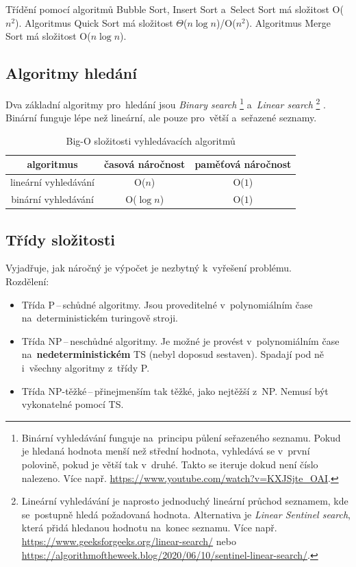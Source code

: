 Třídění pomocí algoritmů Bubble Sort, Insert Sort a~Select Sort má složitost O(\( n^2 \)). Algoritmus Quick Sort má složitost \( \Theta \)(\( n\log{n} \))/O(\( n^2 \)). Algoritmus Merge Sort má složitost O(\( n\log{n} \)).

\subsection{Algoritmy hledání}

Dva základní algoritmy pro~hledání jsou \textit{Binary search}%
\footnote{Binární vyhledávání funguje na~principu půlení seřazeného seznamu. Pokud je hledaná hodnota menší než střední hodnota, vyhledává se v~první polovině, pokud je větší tak v~druhé. Takto se iteruje dokud není číslo nalezeno. Více např. \url{https://www.youtube.com/watch?v=KXJSjte_OAI}.} %
a~\textit{Linear search}%
\footnote{Lineární vyhledávání je naprosto jednoduchý lineární průchod seznamem, kde se~postupně hledá požadovaná hodnota. Alternativa je \emph{Linear Sentinel search}, která přidá hledanou hodnotu na~konec seznamu. Více např. \url{https://www.geeksforgeeks.org/linear-search/} nebo \url{https://algorithmoftheweek.blog/2020/06/10/sentinel-linear-search/}.}%
. Binární funguje lépe než lineární, ale pouze pro~větší a~seřazené seznamy.

\begin{table}[h]
	\centering
	\caption{Big-O složitosti vyhledávacích algoritmů}
	\begin{tabular}{|c||c|c|}\hline
		algoritmus           & časová náročnost & paměťová náročnost \\\hline\hline
		lineární vyhledávání & O(\( n \))       & O(\( 1 \))         \\\hline
		binární vyhledávání  & O(\( \log n \))  & O(\( 1 \))         \\\hline
	\end{tabular}
\end{table}

\subsection{Třídy složitosti}

Vyjadřuje, jak náročný je výpočet je nezbytný k~vyřešení problému. \\
Rozdělení:
\begin{itemize}
	\item Třída P\,--\,schůdné algoritmy. Jsou proveditelné v~polynomiálním čase na~deterministickém turingově stroji.
	\item Třída NP\,--\,neschůdné algoritmy. Je možné je provést v~polynomiálním čase na~\textbf{nedeterministickém} TS (nebyl doposud sestaven). Spadají pod ně i~všechny algoritmy z~třídy P.
	\item Třída NP-těžké\,--\,přinejmenším tak těžké, jako nejtěžší z~NP. Nemusí být vykonatelné pomocí TS.
\end{itemize}

